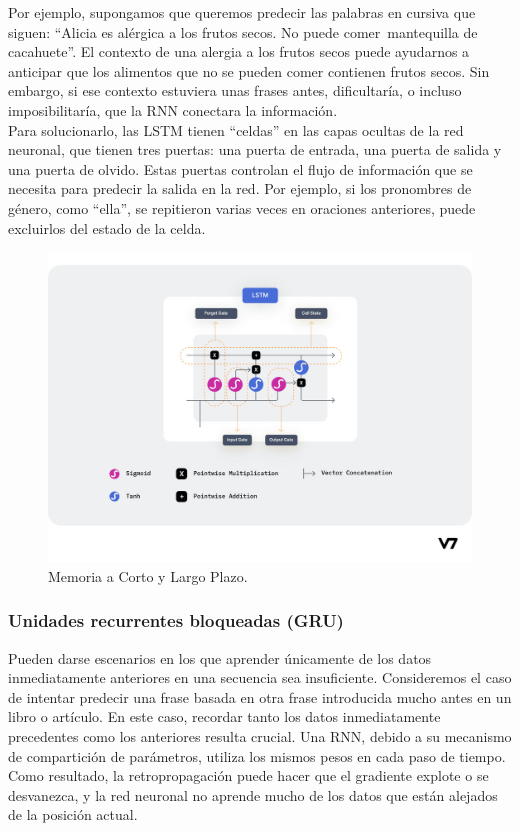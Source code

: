 \documentclass{article}
\begin{document}
Por ejemplo, supongamos que queremos predecir las palabras en cursiva que siguen: ``Alicia es alérgica a los frutos secos. No puede comer mantequilla de cacahuete''. El contexto de una alergia a los frutos secos puede ayudarnos a anticipar que los alimentos que no se pueden comer contienen frutos secos. Sin embargo, si ese contexto estuviera unas frases antes, dificultaría, o incluso imposibilitaría, que la RNN conectara la información. \\

Para solucionarlo, las LSTM tienen ``celdas'' en las capas ocultas de la red neuronal, que tienen tres puertas: una puerta de entrada, una puerta de salida y una puerta de olvido. Estas puertas controlan el flujo de información que se necesita para predecir la salida en la red. Por ejemplo, si los pronombres de género, como ``ella'', se repitieron varias veces en oraciones anteriores, puede excluirlos del estado de la celda. \\

\begin{figure}[H]
    \centering
    \includegraphics[scale=0.3]{lstm.png}
    \caption{Memoria a Corto y Largo Plazo.}
\end{figure}

\newpage

\subsubsection{Unidades recurrentes bloqueadas (GRU)}
Pueden darse escenarios en los que aprender únicamente de los datos inmediatamente anteriores en una secuencia sea insuficiente. Consideremos el caso de intentar predecir una frase basada en otra frase introducida mucho antes en un libro o artículo. En este caso, recordar tanto los datos inmediatamente precedentes como los anteriores resulta crucial. Una RNN, debido a su mecanismo de compartición de parámetros, utiliza los mismos pesos en cada paso de tiempo. Como resultado, la retropropagación puede hacer que el gradiente explote o se desvanezca, y la red neuronal no aprende mucho de los datos que están alejados de la posición actual. \\
\end{document}
